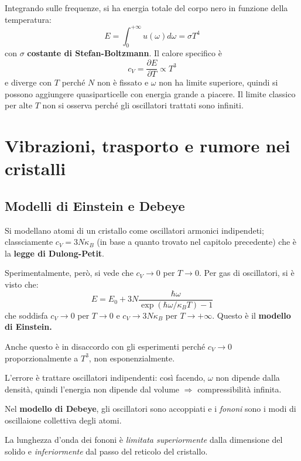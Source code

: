 \documentclass[10pt, a4paper]{scrartcl}
\numberwithin{equation}{subsection}
\theoremstyle{style1}
\begin{document}
Integrando sulle frequenze, si ha energia totale del corpo nero in funzione della temperatura:
\begin{equation}
	E = \int_{0} ^{+\infty} u(\omega) d\omega = \sigma T^4
\end{equation}
con $\sigma $ \textbf{costante di Stefan-Boltzmann}. Il calore specifico \`e 
\begin{equation}
	c_ V = \frac{\partial E}{\partial T} \propto T^3		
\end{equation}
e diverge con $T$  perch\'e $N$ non \`e fissato e $\omega$ non ha limite superiore, quindi si possono aggiungere quasiparticelle con energia grande a piacere. 
Il limite classico per alte $T$ non si osserva perch\'e gli oscillatori trattati sono infiniti.

\newpage

\section{Vibrazioni, trasporto e rumore nei cristalli}
\subsection{Modelli di Einstein e Debeye}
Si modellano atomi di un cristallo come oscillatori armonici indipendeti; classciamente $c_V = 3 N \kappa _B$ (in base a quanto trovato nel capitolo precedente)
che \`e la \textbf{legge di Dulong-Petit}.

Sperimentalmente, però, si vede che $c_V \to 0 $ per $T \to 0$.
Per gas di oscillatori, si \`e visto che:
\[
E = E_0 + 3N \frac{\hbar \omega}{\exp(\hbar \omega / \kappa _B T) -1 }
\] 
che soddisfa $c_V \to 0$ per $T \to 0$ e $c_V \to 3N \kappa _B $ per $T \to + \infty$. 
Questo \`e il \textbf{modello di Einstein.} 

Anche questo \`e in disaccordo con gli esperimenti perch\'e $c_V \to 0$ proporzionalmente a $T^3$, non esponenzialmente.

L'errore \`e trattare oscillatori indipendenti: cos\`i facendo, $\omega$ non dipende dalla densit\`a, quindi l'energia non dipende dal volume $\Rightarrow $ compressibilit\`a infinita.

Nel \textbf{modello di Debeye}, gli oscillatori sono accoppiati e i \textit{fononi} sono i modi di oscillaione collettiva degli atomi.

La lunghezza d'onda dei fononi \`e \textit{limitata superiormente} dalla dimensione del solido e \textit{inferiormente} dal passo del reticolo del cristallo.
\end{document}
